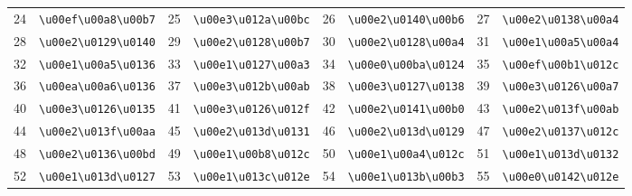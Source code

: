 \begin{table}[!htbp]
\begin{tabular}{r l r l r l r l}
24 & \texttt{\textbackslash{}u00ef\textbackslash{}u00a8\textbackslash{}u00b7} & 25 & \texttt{\textbackslash{}u00e3\textbackslash{}u012a\textbackslash{}u00bc} & 26 & \texttt{\textbackslash{}u00e2\textbackslash{}u0140\textbackslash{}u00b6} & 27 & \texttt{\textbackslash{}u00e2\textbackslash{}u0138\textbackslash{}u00a4} \\
28 & \texttt{\textbackslash{}u00e2\textbackslash{}u0129\textbackslash{}u0140} & 29 & \texttt{\textbackslash{}u00e2\textbackslash{}u0128\textbackslash{}u00b7} & 30 & \texttt{\textbackslash{}u00e2\textbackslash{}u0128\textbackslash{}u00a4} & 31 & \texttt{\textbackslash{}u00e1\textbackslash{}u00a5\textbackslash{}u00a4} \\
32 & \texttt{\textbackslash{}u00e1\textbackslash{}u00a5\textbackslash{}u0136} & 33 & \texttt{\textbackslash{}u00e1\textbackslash{}u0127\textbackslash{}u00a3} & 34 & \texttt{\textbackslash{}u00e0\textbackslash{}u00ba\textbackslash{}u0124} & 35 & \texttt{\textbackslash{}u00ef\textbackslash{}u00b1\textbackslash{}u012c} \\
36 & \texttt{\textbackslash{}u00ea\textbackslash{}u00a6\textbackslash{}u0136} & 37 & \texttt{\textbackslash{}u00e3\textbackslash{}u012b\textbackslash{}u00ab} & 38 & \texttt{\textbackslash{}u00e3\textbackslash{}u0127\textbackslash{}u0138} & 39 & \texttt{\textbackslash{}u00e3\textbackslash{}u0126\textbackslash{}u00a7} \\
40 & \texttt{\textbackslash{}u00e3\textbackslash{}u0126\textbackslash{}u0135} & 41 & \texttt{\textbackslash{}u00e3\textbackslash{}u0126\textbackslash{}u012f} & 42 & \texttt{\textbackslash{}u00e2\textbackslash{}u0141\textbackslash{}u00b0} & 43 & \texttt{\textbackslash{}u00e2\textbackslash{}u013f\textbackslash{}u00ab} \\
44 & \texttt{\textbackslash{}u00e2\textbackslash{}u013f\textbackslash{}u00aa} & 45 & \texttt{\textbackslash{}u00e2\textbackslash{}u013d\textbackslash{}u0131} & 46 & \texttt{\textbackslash{}u00e2\textbackslash{}u013d\textbackslash{}u0129} & 47 & \texttt{\textbackslash{}u00e2\textbackslash{}u0137\textbackslash{}u012c} \\
48 & \texttt{\textbackslash{}u00e2\textbackslash{}u0136\textbackslash{}u00bd} & 49 & \texttt{\textbackslash{}u00e1\textbackslash{}u00b8\textbackslash{}u012c} & 50 & \texttt{\textbackslash{}u00e1\textbackslash{}u00a4\textbackslash{}u012c} & 51 & \texttt{\textbackslash{}u00e1\textbackslash{}u013d\textbackslash{}u0132} \\
52 & \texttt{\textbackslash{}u00e1\textbackslash{}u013d\textbackslash{}u0127} & 53 & \texttt{\textbackslash{}u00e1\textbackslash{}u013c\textbackslash{}u012e} & 54 & \texttt{\textbackslash{}u00e1\textbackslash{}u013b\textbackslash{}u00b3} & 55 & \texttt{\textbackslash{}u00e0\textbackslash{}u0142\textbackslash{}u012e} \\

\end{tabular}
\end{table}
